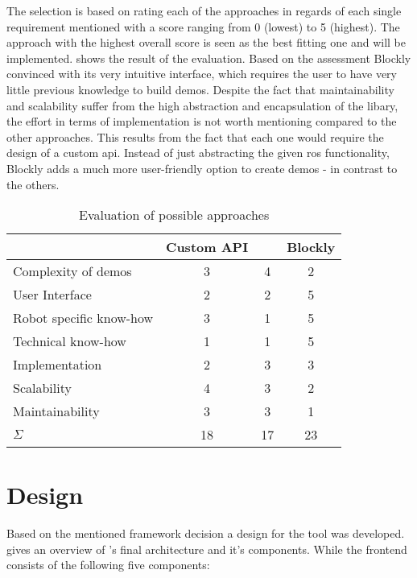 The selection is based on rating each of the approaches in regards of each single requirement mentioned with a score ranging from 0 (lowest) to 5 (highest). The approach with the highest overall score is seen as the best fitting one and will be implemented.  shows the result of the evaluation. Based on the assessment Blockly convinced with its very intuitive interface, which requires the user to have very little previous knowledge to build demos. Despite the fact that maintainability and scalability suffer from the high abstraction and encapsulation of the libary, the effort in terms of implementation is not worth mentioning compared to the other approaches. This results from the fact that each one would require the design of a custom \gls{api}. Instead of just abstracting the given \gls{ros} functionality, Blockly adds a much more user-friendly option to create demos - in contrast to the others.

\begin{table}[htbp]
	\centering
	\begin{tabular}{l c c c}
		\toprule
		                        & Custom API & \smach{} & Blockly \\
		\midrule
		Complexity of demos     & 3          & 4        & 2       \\
		User Interface          & 2          & 2        & 5       \\
		Robot specific know-how & 3          & 1        & 5       \\
		Technical know-how      & 1          & 1        & 5       \\
		Implementation          & 2          & 3        & 3       \\
		Scalability             & 4          & 3        & 2       \\
		Maintainability         & 3          & 3        & 1       \\
		\bottomrule
		$\Sigma$                & 18         & 17       & 23      \\
	\end{tabular}
	\caption{Evaluation of possible approaches}
	\label{tab:decision}
\end{table}

\section{Design} \label{sec:ArchitectureOverview}
Based on the mentioned framework decision a design for the tool was developed.  gives an overview of \toolname{}'s final architecture and it's components. While the frontend consists of the following five components:

